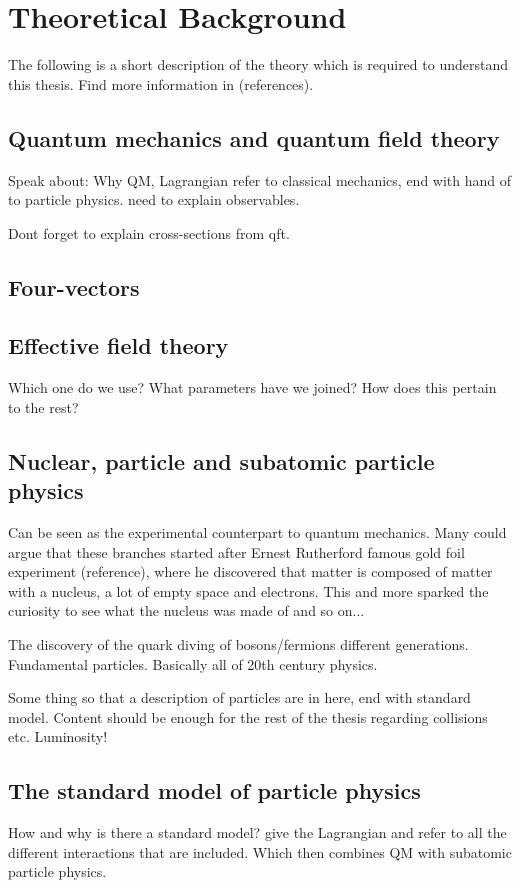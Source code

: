 \section{Theoretical Background}\label{sec:tb}
The following is a short description of the theory which is required to understand this thesis. Find more information in (references).
\subsection{Quantum mechanics and quantum field theory}
Speak about: Why QM, Lagrangian refer to classical mechanics, end with hand of to particle physics. need to explain observables.

Dont forget to explain cross-sections from qft.
\subsection{Four-vectors}
\subsection{Effective field theory}
Which one do we use? What parameters have we joined?
How does this pertain to the rest?

\subsection{Nuclear, particle and subatomic particle physics}
Can be seen as the experimental counterpart to quantum mechanics.
Many could argue that these branches started after Ernest Rutherford famous gold foil experiment (reference), where he discovered that matter is composed of matter with a nucleus, a lot of empty space and electrons. This and more sparked the curiosity to see what the nucleus was made of and so on... 

The discovery of the quark diving of bosons/fermions different generations. Fundamental particles. Basically all of 20th century physics. 

Some thing so that a description of particles are in here, end with standard model.
Content should be enough for the rest of the thesis regarding collisions etc.
Luminosity!

\subsection{The standard model of particle physics} 
How and why is there a standard model? give the Lagrangian and refer to all the different interactions that are included. Which then combines QM with subatomic particle physics.
 
